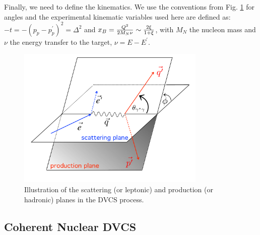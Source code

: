 \documentclass[aps,prc,preprint,superscriptaddress]{revtex4}
\begin{document}
Finally, we need to define the kinematics. We use the 
conventions from Fig. \ref{fig:PhiAngle} for angles and the experimental kinematic variables
used here are defined as: 
$-t = -(p_p-p_p^\prime)^2 = \Delta^2$ and 
$x_B = {Q^2 \over 2 M_N \nu}\sim {2\xi \over 1+\xi}$, with $M_N$ the nucleon mass and $\nu$ the
energy transfer to the target, $\nu = {E -E^\prime} $. 

\begin{figure}[tbp!]
\center
\includegraphics[width=9cm]{finalplane.png}
	\caption{Illustration of the scattering (or leptonic) and production (or hadronic) planes
	in the DVCS process.} 
\label{fig:PhiAngle}
\end{figure}



\subsection{Coherent Nuclear DVCS}
\end{document}
